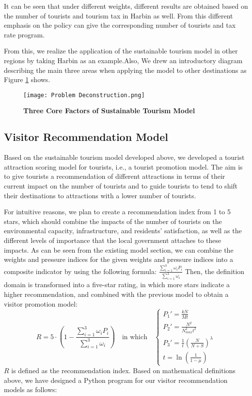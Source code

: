 \documentclass{mcmthesis}
\begin{document}
{It can be seen that under different weights, different results are obtained based on the number of tourists and tourism tax in Harbin as well. From this different emphasis on the policy can give the corresponding number of tourists and tax rate program.}

{From this, we realize the application of the sustainable tourism model in other regions by taking Harbin as an example.Also, We drew an introductory diagram describing the main three areas when applying the model to other destinations as Figure \ref{fig:Problem Deconstruction} shows.}

\begin{figure}[H]
  \small
  \centering
  \texttt{[image: Problem Deconstruction.png]}
  \caption{\textbf{Three Core Factors of Sustainable Tourism Model}} \label{fig:Problem Deconstruction}
\end{figure}

\subsection{Visitor Recommendation Model}
{Based on the sustainable tourism model developed above, we developed a tourist attraction scoring model for tourists, i.e., a tourist promotion model. The aim is to give tourists a recommendation of different attractions in terms of their current impact on the number of tourists and to guide tourists to tend to shift their destinations to attractions with a lower number of tourists.}

{For intuitive reasons, we plan to create a recommendation index from 1 to 5 stars, which should combine the impacts of the number of tourists on the environmental capacity, infrastructure, and residents' satisfaction, as well as the different levels of importance that the local government attaches to these impacts. As can be seen from the existing model section, we can combine the weights and pressure indices for the given weights and pressure indices into a composite indicator by using the following formula:}
{$\frac{\sum\limits_{i=1}^3 \omega_i P_i}{\sum\limits_{i=1}^3 \omega_i}$}
{Then, the definition domain is transformed into a five-star rating, in which more stars indicate a higher recommendation, and combined with the previous model to obtain a visitor promotion model:}
  \begin{equation}
    R = 5\cdot(1-\frac{\sum\limits_{i=1}^3 \omega_i P_i}{\sum\limits_{i=1}^3 \omega_i})
    \quad\text{in which} \quad
    \begin{cases}
    P_1'=\frac{kN}{Mt} \\
    P_2'=\frac{N^2}{N_{max}^2t^2} \\
    P_3'=\frac{1}{t}\left(\frac{N}{N+S}\right)^\lambda \\
    t = \ln\left(\frac{1}{1 - \mu}\right) 
    \end{cases}
  \end{equation}
{$R$ is defined as the recommendation index. Based on mathematical definitions above, we have designed a Python program for our
visitor recommendation models as follows:}
\end{document}
